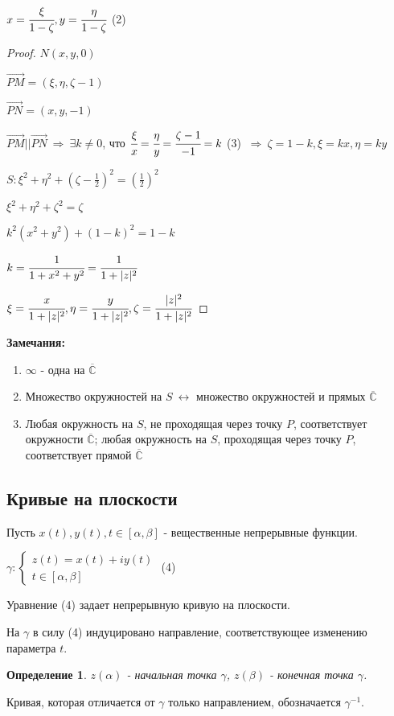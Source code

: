 \documentclass[draft]{report}
\newcommand{\then}{\ \Rightarrow\ }
\renewcommand{\C}{\mathbb{C}}
\renewcommand{\bar}{\overline}
\newcommand{\opr}[1]{\begin{opred}#1\end{opred}}
\newtheorem*{opred}{Определение}
\theoremstyle{remark}
\begin{document}
$x=\cfrac{\xi}{1-\zeta}, y=\cfrac{\eta}{1-\zeta}$ (2)
\begin{proof}
$N(x,y,0)$

$\vec{PM}=(\xi,\eta,\zeta-1)$

$\vec{PN}=(x,y,-1)$

$\vec{PM}||\vec{PN}\then\exists k\neq0$, что $\cfrac\xi x=\cfrac\eta y=\cfrac{\zeta-1}{-1}=k$ (3) $\then\zeta=1-k,\xi=kx, \eta=ky$

$S\colon\xi^2+\eta^2+\left(\zeta-\frac12\right)^2=\left(\frac12\right)^2$

$\xi^2+\eta^2+\zeta^2=\zeta$

$k^2(x^2+y^2)+(1-k)^2=1-k$

$k=\cfrac1{1+x^2+y^2}=\cfrac1{1+|z|^2}$

$\xi=\cfrac{x}{1+|z|^2}, \eta=\cfrac{y}{1+|z|^2}, \zeta=\cfrac{|z|^2}{1+|z|^2}$
\end{proof}
{\bfseries Замечания:}
\begin{enumerate}
\item $\infty$ - одна на $\bar{\C}$
\item Множество окружностей на $S\ \leftrightarrow$ множество окружностей и прямых $\bar{\C}$
\item Любая окружность на $S$, не проходящая через точку $P$, соответствует окружности $\bar{\C}$; любая окружность на $S$, проходящая через точку $P$, соответствует прямой $\bar{\C}$
\end{enumerate}

\subsection{Кривые на плоскости}

Пусть $x(t),y(t),t\in[\alpha,\beta]$ - вещественные непрерывные функции.

$\gamma\colon\left\{\begin{matrix}z(t)=x(t)+iy(t) \\ t\in[\alpha,\beta]\end{matrix}\right.$ (4)

Уравнение (4) задает непрерывную кривую на плоскости.

На $\gamma$ в силу (4) индуцировано направление, соответствующее изменению параметра $t$.

\opr{$z(\alpha)$ - начальная точка $\gamma$, $z(\beta)$ - конечная точка $\gamma$.}

Кривая, которая отличается от $\gamma$ только направлением, обозначается $\gamma^{-1}$.
\end{document}
